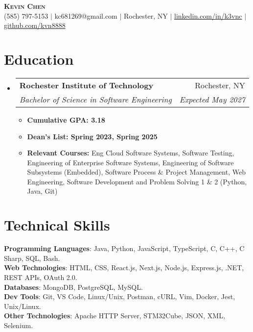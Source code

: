 \documentclass[letterpaper,11pt]{article}
\makeatletter
\newcommand{\resumeItem}[1]{
  \item\small{
    {#1 \vspace{-2pt}}
  }
}
\newcommand{\resumeSubheading}[4]{
  \vspace{-2pt}\item
    \begin{tabular*}{0.97\textwidth}[t]{l@{\extracolsep{\fill}}r}
      \textbf{#1} & #2 \\
      \textit{\small#3} & \textit{\small #4} \\
    \end{tabular*}\vspace{-7pt}
}
\newcommand{\resumeSubHeadingListStart}{\begin{itemize}[leftmargin=0.15in, label={}]}
\newcommand{\resumeSubHeadingListEnd}{\end{itemize}}
\newcommand{\resumeItemListStart}{\begin{itemize}}
\newcommand{\resumeItemListEnd}{\end{itemize}\vspace{-5pt}}
\makeatother
\begin{document}

\begin{center}
    \textbf{\Huge \scshape Kevin Chen} \\ \vspace{1pt}
    \small (585) 797-5153 $|$ kc681269@gmail.com $|$ Rochester, NY $|$ 
    \href{https://www.linkedin.com/in/k3vnc/}{linkedin.com/in/k3vnc} $|$ 
    \href{https://github.com/kvn8888}{github.com/kvn8888}
\end{center}


\section{Education}
  \resumeSubHeadingListStart
    \resumeSubheading
      {Rochester Institute of Technology}{Rochester, NY}
      {Bachelor of Science in Software Engineering}{Expected May 2027}
      \resumeItemListStart
        \resumeItem{\textbf{Cumulative GPA: 3.18}}
        \resumeItem{\textbf{Dean's List: Spring 2023, Spring 2025}}
        \resumeItem{\textbf{Relevant Courses:} Eng Cloud Software Systems, Software Testing, Engineering of Enterprise Software Systems, Engineering of Software Subsystems (Embedded), Software Process \& Project Management, Web Engineering, Software Development and Problem Solving 1 \& 2 (Python, Java, Git)}
      \resumeItemListEnd
  \resumeSubHeadingListEnd

\section{Technical Skills}
\begin{itemize}[leftmargin=0.15in, label={}]
\small{\item{
\textbf{Programming Languages}{: Java, Python, JavaScript, TypeScript, C, C++, C Sharp, SQL, Bash.} \\
\textbf{Web Technologies}{: HTML, CSS, React.js, Next.js, Node.js, Express.js, .NET, REST APIs, OAuth 2.0.} \\
\textbf{Databases}{: MongoDB, PostgreSQL, MySQL.} \\
\textbf{Dev Tools}{: Git, VS Code, Linux/Unix, Postman, cURL, Vim, Docker, Jest, Unix/Linux.} \\
\textbf{Other Technologies}{: Apache HTTP Server, STM32Cube, JSON, XML, Selenium.}}}\\
\end{itemize}
\end{document}
